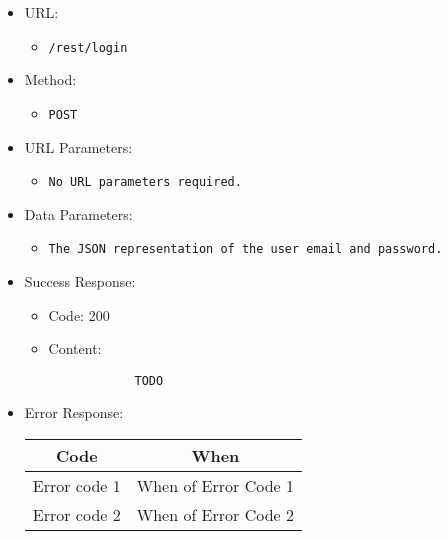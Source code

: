 \begin{itemize}
    
    \item URL: 
    \begin{itemize}
        \item \texttt{/rest/login}
    \end{itemize}
    
    \item Method: 
    \begin{itemize}
        \item \texttt{POST}
    \end{itemize}
    
    \item URL Parameters: 
    \begin{itemize}
        \item \texttt{No URL parameters required.} 
    \end{itemize}
    
    \item Data Parameters: 
    \begin{itemize}
        \item \texttt{The JSON representation of the user email and password.}
    \end{itemize}
    
    \item Success Response: 
    \begin{itemize}
        \item Code: 200
        \item Content:
        \begin{lstlisting}
            TODO
        \end{lstlisting}    
    \end{itemize}
    
    \item Error Response:
    \begin{table}[!h]
    \centering 
    \begin{tabular}{|c|c|}
    \hline
    \multicolumn{1}{|c|}{\textbf{Code}} & \multicolumn{1}{c|}{\textbf{When}} \\ \hline
    Error code 1 & When of Error Code 1 \\\hline
    Error code 2 & When of Error Code 2 \\\hline
    \end{tabular} 
    \end{table} 
    
\end{itemize}


